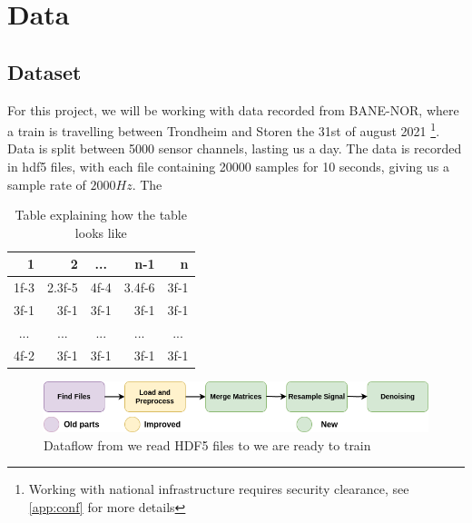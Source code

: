 \section{Data}

\subsection{Dataset}

For this project, we will be working with data recorded from BANE-NOR, where a train is travelling between Trondheim and Storen the 31st of august 2021 \footnote{Working with national infrastructure requires security clearance, see \ref{app:conf} for more details}. Data is split between 5000 sensor channels, lasting us a day.
The data is recorded in \acrshort{hdf5} files, with each file containing 20000 samples for 10 seconds, giving us a sample rate of $2000Hz$. The


\begin{table}[h]
\centering
\begin{tabular}{|r|r|r|r|r|}
\hline
\textbf{1}                & \textbf{2}               & \multicolumn{1}{c|}{\textbf{...}} & \textbf{n-1}             & \textbf{n}               \\ \hline
1f-3                      & 2.3f-5                   & 4f-4                              & 3.4f-6                   & 3f-1                     \\ \hline
3f-1                      & 3f-1                     & 3f-1                              & 3f-1                     & 3f-1                     \\ \hline
\multicolumn{1}{|c|}{...} & \multicolumn{1}{c|}{...} & \multicolumn{1}{c|}{...}          & \multicolumn{1}{c|}{...} & \multicolumn{1}{c|}{...} \\ \hline
4f-2                      & 3f-1                     & 3f-1                              & 3f-1                     & 3f-1                     \\ \hline
\end{tabular}
\caption{Table explaining how the table looks like}
\label{fig:datatable}
\end{table}



\begin{figure}[h]
    \centering
    \includegraphics{figures/dataflow.png}
    \caption{Dataflow from we read HDF5 files to we are ready to train}
    \label{fig:dataflow}
\end{figure}

